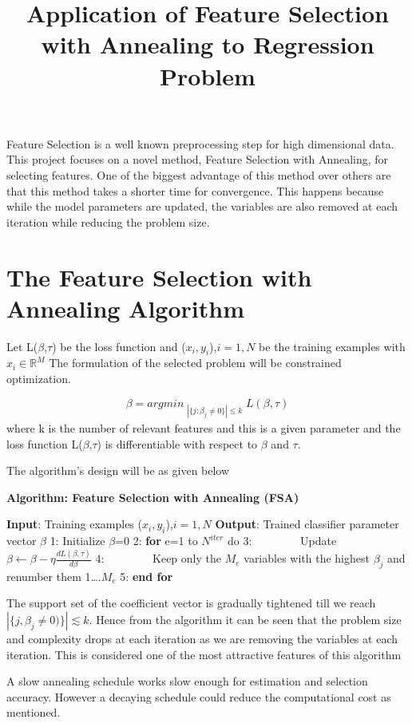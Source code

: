 \documentclass[]{article}
\title{Application of Feature Selection with Annealing to Regression Problem}
\author{}
\date{}
\begin{document}
\maketitle

Feature Selection is a well known preprocessing step for high
dimensional data. This project focuses on a novel method, Feature
Selection with Annealing, for selecting features. One of the biggest
advantage of this method over others are that this method takes a
shorter time for convergence. This happens because while the model
parameters are updated, the variables are also removed at each iteration
while reducing the problem size.

\section{The Feature Selection with Annealing Algorithm}

\noindent
Let L(\(\beta\),\(\tau\)) be the loss function and
(\(x_i,y_i\)),\(i=1,N\) be the training examples with
\(x_i\in\mathbb{R}^{M}\) The formulation of the selected problem will be
constrained optimization.

\[\beta=argmin_{\substack{|\{ j : \beta_j\neq 0\}|\leq k }}L(\beta,\tau)\]
\noindent
where k is the number of relevant features and this is a given parameter
and the loss function L(\(\beta\),\(\tau\)) is differentiable with
respect to \(\beta\) and \(\tau\).

\noindent
The algorithm's design will be as given below

\textbf{Algorithm: Feature Selection with Annealing (FSA)}

\textbf{Input}: Training examples (\(x_i,y_i\)),\(i=1,N\)
\textbf{Output}: Trained classifier parameter vector \(\beta\) 1:
Initialize \(\beta\)=0 2: \textbf{for} e=1 to \(N^{iter}\) do 3:
~~~~~~~~Update
\(\beta\leftarrow \beta-\eta\frac{dL(\beta,\tau)}{d\beta}\) 4:
~~~~~~~~Keep only the \(M_e\) variables with the highest
\textbar{}\(\beta_j\)\textbar{} and renumber them 1\ldots{}.\(M_e\) 5:
\textbf{end for}

\noindent
The support set of the coefficient vector is gradually tightened till we
reach \(|\{j,\beta_j \neq0)\}|\lesssim k\). Hence from the algorithm it
can be seen that the problem size and complexity drops at each iteration
as we are removing the variables at each iteration. This is considered
one of the most attractive features of this algorithm\newline

\noindent
A slow annealing schedule works slow enough for estimation and selection
accuracy. However a decaying schedule could reduce the computational
cost as mentioned.\newline
\end{document}
